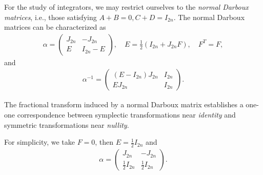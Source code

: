 \documentclass[a4paper,a4paper]{article}
\begin{document}
For the study of integrators, we may restrict ourselves to the {\em normal
Darboux matrices}, i.e., those satisfying $A+B=0, C+D=I_{2n}$. The normal Darboux
matrices can be characterized as
\begin{align}
\alpha=\left(\begin{matrix}J_{2n}&-J_{2n}\\ E& I_{2n}-E\end{matrix}\right), \quad
E=\frac{1}{2}(I_{2n}+J_{2n}F), \quad F^{T}=F, \label{4.4}
\end{align}
and
\begin{align}
\alpha^{-1}=\left(\begin{matrix}(E-I_{2n})J_{2n}&I_{2n}\\ EJ_{2n}& I_{2n}
  \end{matrix}\right). \label{4.5}
\end{align}

The fractional transform induced by a normal Darboux matrix establishes a one-one
correspondence between symplectic transformations near {\em identity} and
symmetric transformations near {\em nullity}.

For simplicity, we take $F=0$, then $E=\frac{1}{2}I_{2n}$ and
\begin{align}
    \alpha=\left(\begin{matrix}J_{2n}&-J_{2n}\\ \frac{1}{2}I_{2n} &
   \frac{1}{2}I_{2n}\end{matrix}\right). \label{4.6}
\end{align}
\end{document}
